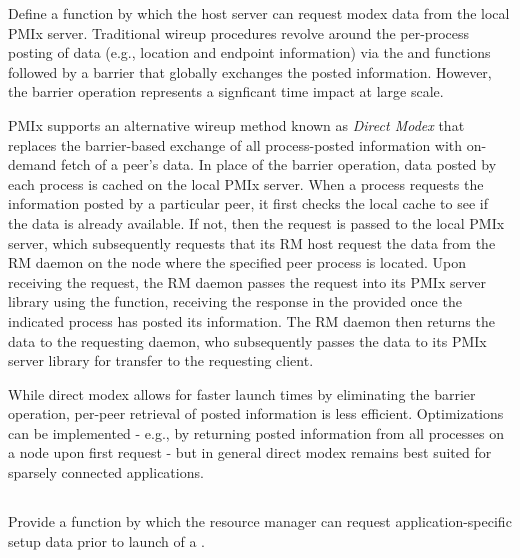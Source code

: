 \descr

Define a function by which the host server can request modex data from the local \ac{PMIx} server. Traditional wireup procedures revolve around the per-process posting of data (e.g., location and endpoint information) via the  and  functions followed by a  barrier that globally exchanges the posted information. However, the barrier operation represents a signficant time impact at large scale.

\ac{PMIx} supports an alternative wireup method known as \textit{Direct Modex} that replaces the barrier-based exchange of all process-posted information with on-demand fetch of a peer's data. In place of the barrier operation, data posted by each process is cached on the local \ac{PMIx} server. When a process requests the information posted by a particular peer, it first checks the local cache to see if the data is already available. If not, then the request is passed to the local \ac{PMIx} server, which subsequently requests that its \ac{RM} host request the data from the \ac{RM} daemon on the node where the specified peer process is located. Upon receiving the request, the \ac{RM} daemon passes the request into its \ac{PMIx} server library using the  function, receiving the response in the provided  once the indicated process has posted its information. The \ac{RM} daemon then returns the data to the requesting daemon, who subsequently passes the data to its \ac{PMIx} server library for transfer to the requesting client.

\adviceuserstart
While direct modex allows for faster launch times by eliminating the barrier operation, per-peer retrieval of posted information is less efficient. Optimizations can be implemented - e.g., by returning posted information from all processes on a node upon first request - but in general direct modex remains best suited for sparsely connected applications.
\adviceuserend

\subsection{}

\summary

Provide a function by which the resource manager can request application-specific setup data prior to launch of a .


